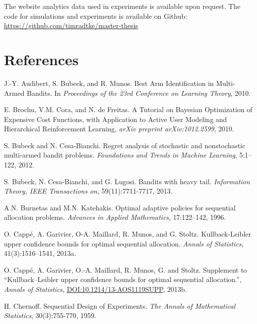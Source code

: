 \documentclass[11pt,]{article}
\begin{document}
The website analytics data used in experiments is available upon
request. The code for simulations and experiments is available on
Github: \url{https://github.com/timradtke/master-thesis}

\newpage

\section{References}\label{references}

J.-Y. Audibert, S. Bubeck, and R. Munos. Best Arm Identification in
Multi-Armed Bandits. In \emph{Proceedings of the 23rd Conference on
Learning Theory}, 2010.\par

E. Brochu, V.M. Cora, and N. de Freitas. A Tutorial on Bayesian
Optimization of Expensive Cost Functions, with Application to Active
User Modeling and Hierarchical Reinforcement Learning, \emph{arXiv
preprint arXiv:1012.2599}, 2010. \par

S. Bubeck and N. Cesa-Bianchi. Regret analysis of stochastic and
nonstochastic multi-armed bandit problems. \emph{Foundations and Trends
in Machine Learning}, 5:1--122, 2012.\par

S. Bubeck, N. Cesa-Bianchi, and G. Lugosi. Bandits with heavy tail.
\emph{Information Theory, IEEE Transactions on}, 59(11):7711-7717,
2013.\par

A.N. Burnetas and M.N. Katehakis. Optimal adaptive policies for
sequential allocation problems. \emph{Advances in Applied Mathematics},
17:122--142, 1996.\par

O. Cappé, A. Garivier, O-A. Maillard, R. Munos, and G. Stoltz.
Kullback-Leibler upper confidence bounds for optimal sequential
allocation. \emph{Annals of Statistics}, 41(3):1516--1541, 2013a.\par

O. Cappé, A. Garivier, O.-A. Maillard, R. Munos, G. and Stoltz.
Supplement to ``Kullback--Leibler upper confidence bounds for optimal
sequential allocation.'', \emph{Annals of Statistics},
\url{DOI:10.1214/13-AOS1119SUPP}, 2013b. \par

H. Chernoff. Sequential Design of Experiments. \emph{The Annals of
Mathematical Statistics}, 30(3):755-770, 1959. \par
\end{document}
